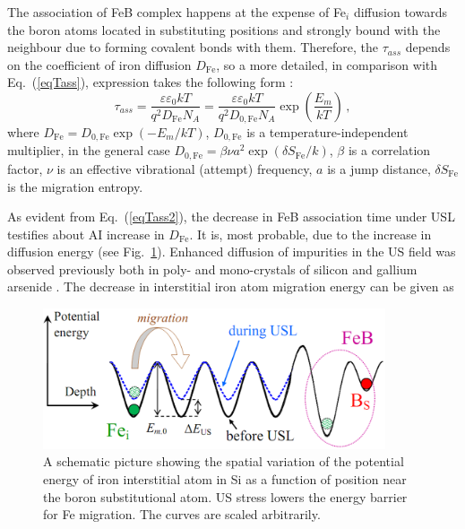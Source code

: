 The association of FeB complex happens at the  expense of  Fe$_i$ diffusion towards the
boron atoms located in substituting positions and strongly bound with the neighbour due to forming covalent bonds with them.
Therefore, the $\tau_{ass}$ depends on the coefficient of iron diffusion $D_\mathrm{Fe}$,
so a more detailed, in comparison with Eq.~(\ref{eqTass}), expression takes the following form \cite{FeBAssJAP2014,FeBJAP2005,FeBKin2019}:
\begin{equation}
\label{eqTass2}
\tau_{ass}=\frac{\varepsilon\varepsilon_0 kT}{q^2D_\mathrm{Fe}N_A}=
\frac{\varepsilon\varepsilon_0 kT}{q^2D_\mathrm{0,Fe}N_A}\exp\left(\frac{E_m}{kT}\right)\,,
\end{equation}
where
$D_\mathrm{Fe}=D_\mathrm{0,Fe}\exp(-E_m/kT)$,
$D_\mathrm{0,Fe}$ is a temperature-independent multiplier,
in the general case \cite{AZIZ2001,Stavola,WeberFe}
$D_\mathrm{0,Fe}=\beta\nu a^2\exp(\delta S_\mathrm{Fe}/k)$,
$\beta$ is a correlation factor,
$\nu$  is an effective vibrational (attempt) frequency,
$a$ is a jump distance,
$\delta S_\mathrm{Fe}$ is the migration entropy.

As evident from Eq.~(\ref{eqTass2}), the decrease in FeB association time under USL testifies about
AI increase in $D_\mathrm{Fe}$.
It is, most probable, due to the increase in diffusion energy (see Fig.~\ref{figUSChem}).
Enhanced diffusion of impurities in the US field was observed previously
both in poly- and mono-crystals of silicon and gallium arsenide \cite{Ostapenko1999,Zaveryukhin2002}.
The decrease in interstitial iron atom migration energy can be given as
\begin{figure}
 \includegraphics[width=0.9\textwidth]{Fig7}
\caption{
A schematic picture showing the spatial variation of the potential energy of
iron interstitial atom in Si as a function of position near the boron substitutional atom.
US stress lowers the energy barrier for Fe migration.
The curves are scaled arbitrarily.
}
\label{figUSChem}       %
\end{figure}

